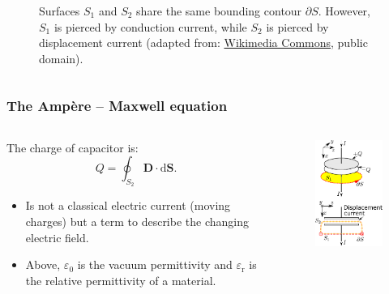 \begin{frame}
\begin{columns}
\begin{column}{0.45\textwidth}
\begin{figure}
				\caption{Surfaces $S_1$ and $S_2$ share the same bounding contour $\partial S$. However, $S_1$ is pierced by conduction current, while $S_2$ is pierced by displacement current (adapted from: \href{https://commons.wikimedia.org/wiki/File:Displacement_current_in_capacitor.svg}{Wikimedia Commons}, public domain).}
			\end{figure}
		\end{column}
		\end{columns}
\end{frame}

\begin{frame}
	\frametitle{The Amp\`ere -- Maxwell equation}
	\begin{columns}
		\begin{column}{0.6\textwidth}
			The charge of capacitor is:
            $$Q = \oint_{S_2} \bm{D}\cdot \mathrm{d}\bm{S}.$$
            \begin{itemize}
                \item<3-> Is not a classical electric current (moving charges) but a term to describe the changing electric field.
                \item<4-> Above, $\varepsilon_0$ is the vacuum permittivity and $\varepsilon_\mathrm{r}$ is the relative permittivity of a material.
            \end{itemize}
		\end{column}
        \hfill
		\begin{column}{0.4\textwidth}
			\begin{figure}
				\centering
				\includegraphics[height=0.65\textheight]{fig/lec02/Maxwell_integral_displacement_current.pdf}

\end{figure}
\end{column}
\end{columns}
\end{frame}
